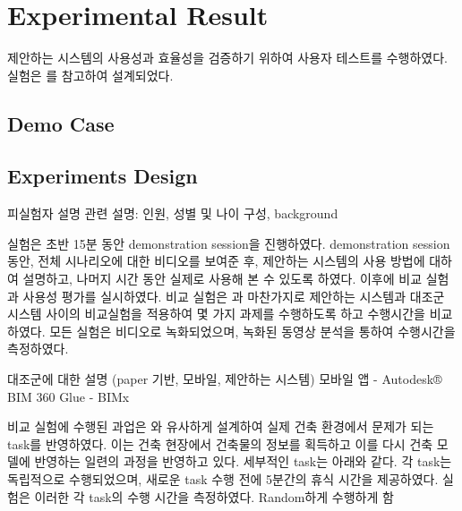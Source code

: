 
\section{Experimental Result}

제안하는 시스템의 사용성과 효율성을 검증하기 위하여 사용자 테스트를 수행하였다. 실험은 \cite{yeh_-site_2012,lin_using_2014}를 참고하여 설계되었다.

\subsection{Demo Case}




\subsection{Experiments Design}


피실험자 설명 관련 설명: 인원, 성별 및 나이 구성, background

실험은 초반 15분 동안 demonstration session을 진행하였다. demonstration session 동안, 전체 시나리오에 대한 비디오를 보여준 후, 제안하는 시스템의 사용 방법에 대하여 설명하고, 나머지 시간 동안 실제로 사용해 본 수 있도록 하였다. 이후에 비교 실험과 사용성 평가를 실시하였다. 비교 실험은 \cite{yeh_-site_2012}과 마찬가지로 제안하는 시스템과 대조군 시스템 사이의 비교실험을 적용하여 몇 가지 과제를 수행하도록 하고 수행시간을 비교하였다. 모든 실험은 비디오로 녹화되었으며, 녹화된 동영상 분석을 통하여 수행시간을 측정하였다. 

대조군에 대한 설명 (paper 기반, 모바일, 제안하는 시스템)
모바일 앱
 - Autodesk® BIM 360 Glue
 - BIMx 

비교 실험에 수행된 과업은 \cite{yeh_-site_2012}와 유사하게 설계하여 실제 건축 환경에서 문제가 되는 task를 반영하였다. 이는 건축 현장에서 건축물의 정보를 획득하고 이를 다시 건축 모델에 반영하는 일련의 과정을 반영하고 있다. 세부적인 task는 아래와 같다. 각 task는 독립적으로 수행되었으며, 새로운 task 수행 전에 5분간의 휴식 시간을 제공하였다. 실험은 이러한 각 task의 수행 시간을 측정하였다. 
Random하게 수행하게 함

